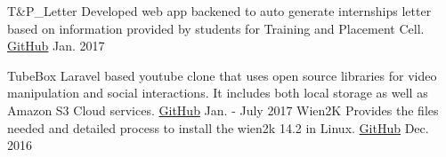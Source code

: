\begin{cvhonors}
  \cvhonor
    {T\&P\_Letter} %
    {Developed web app backened to auto generate internships letter based on information provided by students for Training and Placement Cell.} %
    {\href{https://github.com/vijaypurohit/T-P_letterhead}{GitHub}} %
    {Jan. 2017} %
    	
  \cvhonor
    {TubeBox} %
    {Laravel based youtube clone that uses open source libraries for video manipulation and social interactions. It includes both local storage as well as Amazon S3 Cloud services.} %
    {\href{https://github.com/vijaypurohit/tubebox}{GitHub}} %
    {Jan. - July 2017} %
  \cvhonor
    {Wien2K} %
    {Provides the files needed and detailed process to install the wien2k 14.2 in Linux.} %
    {\href{https://github.com/vijaypurohit/wien2k}{GitHub}} %
    {Dec. 2016} %

\end{cvhonors}
